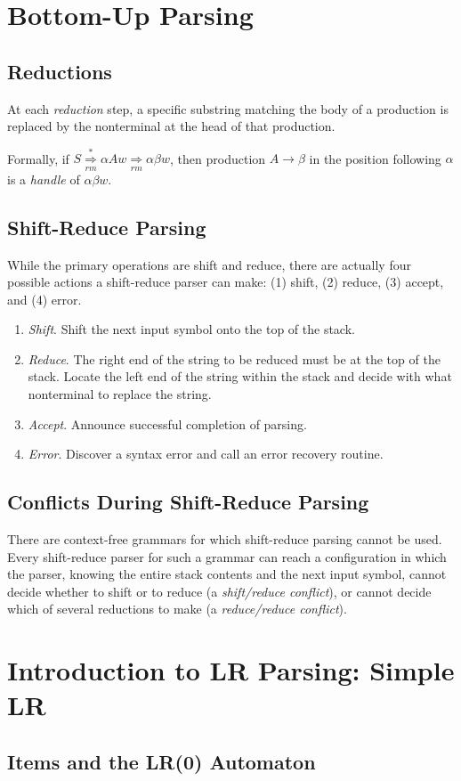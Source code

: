 \documentclass[a4paper,twoside]{book}
\begin{document}
\section{Bottom-Up Parsing}
\subsection{Reductions}

At each \textit{reduction} step, a specific substring matching the body of a production is replaced by the nonterminal at the head of that production.

Formally, if $S\underset{rm}{\overset{*}{\Rightarrow}}\alpha Aw\underset{rm}{\Rightarrow}\alpha\beta w$, then production $A\rightarrow\beta$ in the position following $\alpha$ is a \textit{handle} of $\alpha\beta w$.

\subsection{Shift-Reduce Parsing}

While the primary operations are shift and reduce, there are actually four possible actions a shift-reduce parser can make: (1) shift, (2) reduce, (3) accept, and (4) error.
\begin{enumerate}
    \item \textit{Shift}. Shift the next input symbol onto the top of the stack.
    \item \textit{Reduce}. The right end of the string to be reduced must be at the top of the stack. Locate the left end of the string within the stack and decide with what nonterminal to replace the string.
    \item \textit{Accept}. Announce successful completion of parsing.
    \item \textit{Error}. Discover a syntax error and call an error recovery routine.
\end{enumerate}

\subsection{Conflicts During Shift-Reduce Parsing}

There are context-free grammars for which shift-reduce parsing cannot be used. Every shift-reduce parser for such a grammar can reach a configuration in which the parser, knowing the entire stack contents and the next input symbol, cannot decide whether to shift or to reduce (a \textit{shift/reduce conflict}), or cannot decide which of several reductions to make (a \textit{reduce/reduce conflict}).

\section{Introduction to LR Parsing: Simple LR}
\subsection{Items and the LR(0) Automaton}

\end{document}

